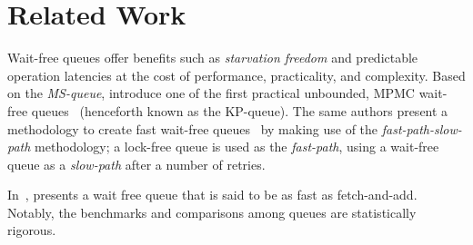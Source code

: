 


\section{Related Work}
Wait-free queues offer benefits such as \emph{starvation freedom} and predictable
operation latencies at the cost of performance, practicality, and complexity.
Based on the \emph{MS-queue}, \citeauthor{kogan2011wait} introduce one of the first practical unbounded, MPMC
wait-free queues~\citep{kogan2011wait} (henceforth known as the KP-queue). The
same authors present a methodology to create fast wait-free queues~\citep{kogan2012methodology} by
making use of the \emph{fast-path-slow-path} methodology; a lock-free queue is
used as the \emph{fast-path}, using a wait-free queue as a \emph{slow-path}
after a number of retries.

In~\citep{yang2016wait}, \citeauthor{yang2016wait} presents a wait free queue
that is said to be as fast as fetch-and-add. Notably, the benchmarks and
comparisons among queues are statistically rigorous.
